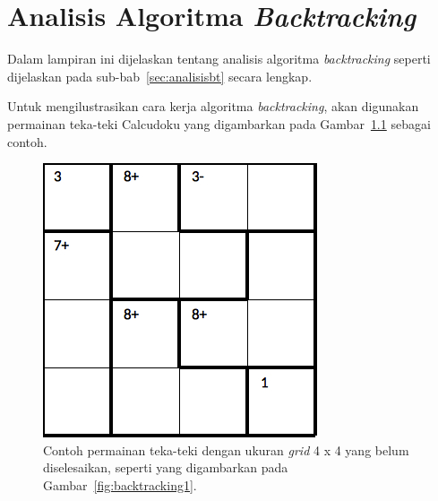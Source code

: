 \chapter{Analisis Algoritma \textit{Backtracking}}
\label{chap:analisisbacktracking}

Dalam lampiran ini dijelaskan tentang analisis algoritma \textit{backtracking} seperti dijelaskan pada sub-bab~\ref{sec:analisisbt} secara lengkap.

Untuk mengilustrasikan cara kerja algoritma \textit{backtracking}, akan digunakan permainan teka-teki Calcudoku yang digambarkan pada Gambar~\ref{fig:lampiranbt1} sebagai contoh.

\begin{figure}
\centering
\captionsetup{justification=centering}
\includegraphics[scale=0.333]{Gambar/backtracking/State1}
\caption[Contoh permainan teka-teki Calcudoku dengan ukuran \textit{grid} 4 x 4 yang belum diselesaikan, seperti yang digambarkan pada Gambar~\ref{fig:backtracking1}.  ~\cite{fahda:16:backtracking}]{Contoh permainan teka-teki dengan ukuran \textit{grid} 4 x 4 yang belum diselesaikan, seperti yang digambarkan pada Gambar~\ref{fig:backtracking1}.  ~\cite{fahda:16:backtracking}}
\label{fig:lampiranbt1}
\end{figure}

